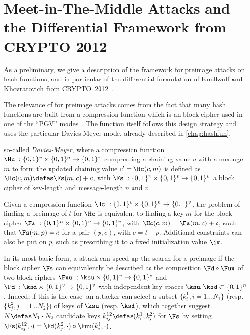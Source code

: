 \section{Meet-in-The-Middle Attacks and the Differential Framework from CRYPTO 2012}
\label{KKFramework}

As a preliminary, we give a description of the \mitm framework for preimage attacks on hash functions,
and in particular of the differential formulation of Knellwolf and Khovratovich from CRYPTO~2012~\cite{DBLP:conf/crypto/KnellwolfK12}.

The relevance of \mitm for preimage attacks comes from the fact that many hash functions are built from a compression
function which is an \ah block cipher used in one of the ``PGV'' modes~\cite{PGV93}.
The \shaone function itself follows this design strategy and uses the particular Davies-Meyer mode, already described
in \autoref{chap:hashfun}.

so-called \emph{Davies-Meyer}, where a compression function $\Hc~: \{0, 1\}^v \times \{0, 1\}^n \rightarrow \{0, 1\}^v$ compressing a chaining value $c$ with
a message $m$ to form the updated chaining value $c' = \Hc(c, m)$ is defined as $\Hc(c, m) \defas \Fs(m, c) + c$, with
$\Fs~: \{0, 1\}^n \times \{0, 1\}^v \rightarrow \{0, 1\}^v$ a block cipher of key-length and message-length $n$ and $v$

Given a compression function $\Hc~: \{0, 1\}^v \times \{0, 1\}^n \rightarrow \{0, 1\}^v$,
the problem of finding a preimage of $t$ for $\Hc$ is equivalent to finding a key $m$ for
the block cipher $\Fs~: \{0, 1\}^n \times \{0, 1\}^v \rightarrow \{0, 1\}^v$, with $\Hc(c,m) = \Fs(m,c) + c$,
such that $\Fs(m, p) = c$ for a pair $(p, c)$, with $c = t - p$. Additional constraints can also be put on $p$, such as prescribing
it to a fixed initialization value $\iv$.

In its most basic form, a \mitm attack can speed-up the search for a preimage if the block cipher $\Fs$ can equivalently be
described as the composition $\Fd \circ \Fuu$ of two block ciphers $\Fuu~: \ksu \times \{0, 1\}^v
\rightarrow \{0, 1\}^v$ and $\Fd~: \ksd \times \{0, 1\}^v\rightarrow \{0, 1\}^v$ with independent key spaces $\ksu, \ksd \subset \{0,1\}^n$.
Indeed, if this is the case, an attacker can select a subset $\{k^1_i, i = 1\ldots N_1\}$ (resp. $\{k^2_j, j = 1\ldots N_2\}$)
of keys of $\ksu$ (resp. $\ksd$), which
together suggest $N \defas N_1 \cdot N_2$ candidate keys $k^{12}_{ij} \defas (k^1_i, k^2_j)$ for $\Fs$ by setting
$\Fs(k^{12}_{ij},\cdot) = \Fd(k^2_j,\cdot) \circ \Fuu(k^1_i,\cdot)$.

